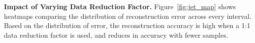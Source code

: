 \textbf{Impact of Varying Data Reduction Factor.} Figure~\ref{fig:jet_map} shows heatmaps comparing the distribution of reconstruction error across every interval.
%
Based on the distribution of error, the reconstruction accuracy is high when a 1:1 data reduction factor is used, and reduces in accuracy with fewer samples.
%
%
%

